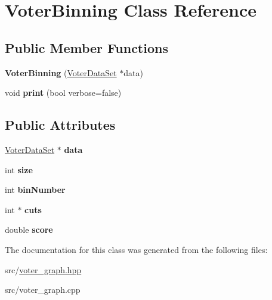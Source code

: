 \hypertarget{classVoterBinning}{\section{Voter\-Binning Class Reference}
\label{classVoterBinning}
}
\subsection*{Public Member Functions}
\begin{DoxyCompactItemize}
\item 
\hypertarget{classVoterBinning_a4626ce3a1bb1aa2108afcfd63af89305}{{\bfseries Voter\-Binning} (\hyperlink{classVoterDataSet}{Voter\-Data\-Set} $\ast$data)}\label{classVoterBinning_a4626ce3a1bb1aa2108afcfd63af89305}

\item 
\hypertarget{classVoterBinning_acf647389a12d6e0838fec89eee8df72e}{void {\bfseries print} (bool verbose=false)}\label{classVoterBinning_acf647389a12d6e0838fec89eee8df72e}

\end{DoxyCompactItemize}
\subsection*{Public Attributes}
\begin{DoxyCompactItemize}
\item 
\hypertarget{classVoterBinning_abfb5cba676d4523a0db4253da90defd4}{\hyperlink{classVoterDataSet}{Voter\-Data\-Set} $\ast$ {\bfseries data}}\label{classVoterBinning_abfb5cba676d4523a0db4253da90defd4}

\item 
\hypertarget{classVoterBinning_a301ba12a243476ac1b7f7bdaa2bdf4b4}{int {\bfseries size}}\label{classVoterBinning_a301ba12a243476ac1b7f7bdaa2bdf4b4}

\item 
\hypertarget{classVoterBinning_a58e6aa4792f0b7f22794597742eb44a6}{int {\bfseries bin\-Number}}\label{classVoterBinning_a58e6aa4792f0b7f22794597742eb44a6}

\item 
\hypertarget{classVoterBinning_a5226a976c3ac9a43e9ed485d9de2712a}{int $\ast$ {\bfseries cuts}}\label{classVoterBinning_a5226a976c3ac9a43e9ed485d9de2712a}

\item 
\hypertarget{classVoterBinning_a9d385619fee2689a5530cc8e06f44d37}{double {\bfseries score}}\label{classVoterBinning_a9d385619fee2689a5530cc8e06f44d37}

\end{DoxyCompactItemize}


The documentation for this class was generated from the following files\-:\begin{DoxyCompactItemize}
\item 
src/\hyperlink{voter__graph_8hpp}{voter\-\_\-graph.\-hpp}\item 
src/voter\-\_\-graph.\-cpp\end{DoxyCompactItemize}

